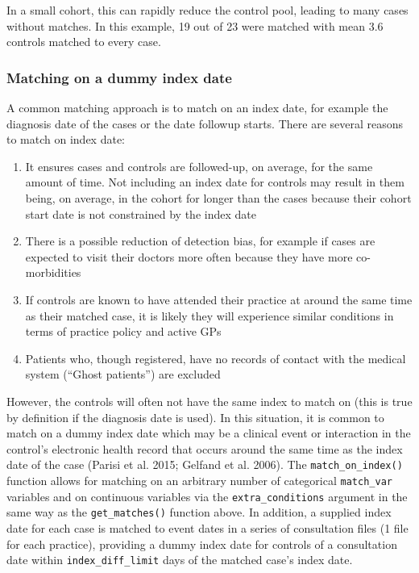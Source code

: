 \documentclass[]{article}
\begin{document}
In a small cohort, this can rapidly reduce the control pool, leading to
many cases without matches. In this example, 19 out of 23 were matched
with mean 3.6 controls matched to every case.

\subsubsection{Matching on a dummy index
date}\label{matching-on-a-dummy-index-date}

A common matching approach is to match on an index date, for example the
diagnosis date of the cases or the date followup starts. There are
several reasons to match on index date:

\begin{enumerate}
\def\labelenumi{\arabic{enumi}.}
\itemsep1pt\parskip0pt
\item
  It ensures cases and controls are followed-up, on average, for the
  same amount of time. Not including an index date for controls may
  result in them being, on average, in the cohort for longer than the
  cases because their cohort start date is not constrained by the index
  date
\item
  There is a possible reduction of detection bias, for example if cases
  are expected to visit their doctors more often because they have more
  co-morbidities
\item
  If controls are known to have attended their practice at around the
  same time as their matched case, it is likely they will experience
  similar conditions in terms of practice policy and active GPs
\item
  Patients who, though registered, have no records of contact with the
  medical system (``Ghost patients'') are excluded
\end{enumerate}

However, the controls will often not have the same index to match on
(this is true by definition if the diagnosis date is used). In this
situation, it is common to match on a dummy index date which may be a
clinical event or interaction in the control's electronic health record
that occurs around the same time as the index date of the case (Parisi
et al. 2015; Gelfand et al. 2006). The \texttt{match\_on\_index()}
function allows for matching on an arbitrary number of categorical
\texttt{match\_var} variables and on continuous variables via the
\texttt{extra\_conditions} argument in the same way as the
\texttt{get\_matches()} function above. In addition, a supplied index
date for each case is matched to event dates in a series of consultation
files (1 file for each practice), providing a dummy index date for
controls of a consultation date within \texttt{index\_diff\_limit} days
of the matched case's index date.
\end{document}
